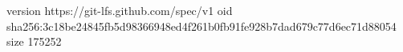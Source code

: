 version https://git-lfs.github.com/spec/v1
oid sha256:3c18be24845fb5d98366948ed4f261b0fb91fe928b7dad679c77d6ec71d88054
size 175252
